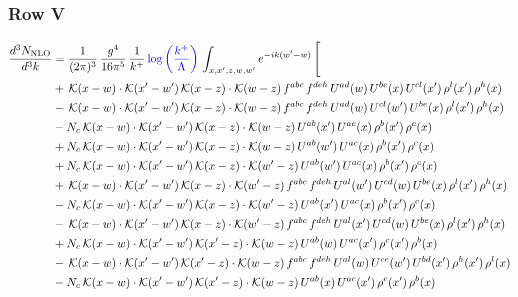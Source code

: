 \documentclass[9pt]{article}
\numberwithin{equation}{section}
\begin{document}
\subsubsection{Row V}
\begin{align}
\frac{d^{3}N_{\mathrm{NLO}}}{d^{3}k} & = \frac{1}{(2\pi)^{3}}\,\frac{g^{4}}{16\pi^{5}}\,\frac{1}{k^{+}}\,{\color{blue}\log{\left(\frac{k^{+}}{\Lambda}\right)}}\,\int_{x,x',z,w,w'}e^{-ik(w'-w)}\,\Bigg[\notag\\ &  +\,\mathcal{K}(x-w)\cdot\mathcal{K}(x'-w')\,\mathcal{K}(x-z)\cdot\mathcal{K}(w-z)\,f^{abc}\,f^{deh}\,U^{ad}(w)\,U^{be}(x)\,U^{cl}(x')\,\rho^{l}(x')\,\rho^{h}(x)\notag\\
& -\,\mathcal{K}(x-w)\cdot\mathcal{K}(x'-w')\,\mathcal{K}(x-z)\cdot\mathcal{K}(w-z)\,f^{abc}\,f^{deh}\,U^{ad}(w)\,U^{cl}(w')\,U^{be}(x)\,\rho^{l}(x')\,\rho^{h}(x)\notag\\
& -N_{c}\,\mathcal{K}(x-w)\cdot\mathcal{K}(x'-w')\,\mathcal{K}(x-z)\cdot\mathcal{K}(w-z)\,U^{ab}(x')\,U^{ac}(x)\,\rho^{b}(x')\,\rho^{c}(x)\notag\\
& +N_{c}\,\mathcal{K}(x-w)\cdot\mathcal{K}(x'-w')\,\mathcal{K}(x-z)\cdot\mathcal{K}(w-z)\,U^{ab}(w')\,U^{ac}(x)\,\rho^{b}(x')\,\rho^{c}(x)\notag\\
& +N_{c}\,\mathcal{K}(x-w)\cdot\mathcal{K}(x'-w')\,\mathcal{K}(x-z)\cdot\mathcal{K}(w'-z)\,U^{ab}(w')\,U^{ac}(x)\,\rho^{b}(x')\,\rho^{c}(x)\notag\\
& +\,\mathcal{K}(x-w)\cdot\mathcal{K}(x'-w')\,\mathcal{K}(x-z)\cdot\mathcal{K}(w'-z)\,f^{abc}\,f^{deh}\,U^{al}(w')\,U^{cd}(w)\,U^{be}(x)\,\rho^{l}(x')\,\rho^{h}(x)\notag\\
& -N_{c}\,\mathcal{K}(x-w)\cdot\mathcal{K}(x'-w')\,\mathcal{K}(x-z)\cdot\mathcal{K}(w'-z)\,U^{ab}(x')\,U^{ac}(x)\,\rho^{b}(x')\,\rho^{c}(x)\notag\\
& -\,\mathcal{K}(x-w)\cdot\mathcal{K}(x'-w')\,\mathcal{K}(x-z)\cdot\mathcal{K}(w'-z)\,f^{abc}\,f^{deh}\,U^{al}(x')\,U^{cd}(w)\,U^{be}(x)\,\rho^{l}(x')\,\rho^{h}(x)\notag\\
& +N_{c}\,\mathcal{K}(x-w)\cdot\mathcal{K}(x'-w')\,\mathcal{K}(x'-z)\cdot\mathcal{K}(w-z)\,U^{ab}(w)\,U^{ac}(x')\,\rho^{c}(x')\,\rho^{b}(x)\notag\\
& -\,\mathcal{K}(x-w)\cdot\mathcal{K}(x'-w')\,\mathcal{K}(x'-z)\cdot\mathcal{K}(w-z)\,f^{abc}\,f^{deh}\,U^{al}(w)\,U^{ce}(w')\,U^{bd}(x')\,\rho^{h}(x')\,\rho^{l}(x)\notag\\
& -N_{c}\,\mathcal{K}(x-w)\cdot\mathcal{K}(x'-w')\,\mathcal{K}(x'-z)\cdot\mathcal{K}(w-z)\,U^{ab}(x)\,U^{ac}(x')\,\rho^{c}(x')\,\rho^{b}(x)\notag\\

\end{align}
\end{document}
